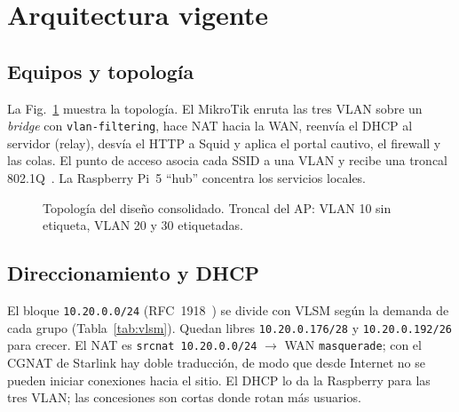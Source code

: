 \documentclass[conference]{IEEEtran}
\begin{document}
\section{Arquitectura vigente}

\subsection{Equipos y topología}
La Fig.~\ref{fig:topo} muestra la topología. El MikroTik enruta las tres VLAN sobre un \textit{bridge} con \texttt{vlan-filtering}, hace NAT hacia la WAN, reenvía el DHCP al servidor (relay), desvía el HTTP a Squid y aplica el portal cautivo, el firewall y las colas. El punto de acceso asocia cada SSID a una VLAN y recibe una troncal 802.1Q~\cite{ieee8021q}. La Raspberry Pi~5 ``hub'' concentra los servicios locales.

\begin{figure}[!htbp]
\centering
{}
\caption{Topología del diseño consolidado. Troncal del AP: VLAN 10 sin etiqueta, VLAN 20 y 30 etiquetadas.}
\label{fig:topo}
\end{figure}

\subsection{Direccionamiento y DHCP}
El bloque \texttt{10.20.0.0/24} (RFC~1918~\cite{rfc1918}) se divide con VLSM según la demanda de cada grupo (Tabla~\ref{tab:vlsm}). Quedan libres \texttt{10.20.0.176/28} y \texttt{10.20.0.192/26} para crecer. El NAT es \texttt{srcnat 10.20.0.0/24} $\rightarrow$ WAN \texttt{masquerade}; con el CGNAT de Starlink hay doble traducción, de modo que desde Internet no se pueden iniciar conexiones hacia el sitio. El DHCP lo da la Raspberry para las tres VLAN; las concesiones son cortas donde rotan más usuarios.
\end{document}
